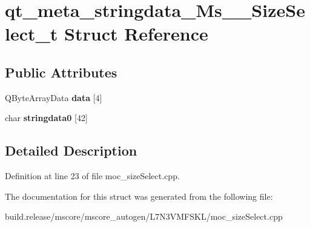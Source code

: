 \hypertarget{structqt__meta__stringdata___ms_____size_select__t}{}\section{qt\+\_\+meta\+\_\+stringdata\+\_\+\+Ms\+\_\+\+\_\+\+Size\+Select\+\_\+t Struct Reference}
\label{structqt__meta__stringdata___ms_____size_select__t}
\subsection*{Public Attributes}
\begin{DoxyCompactItemize}
\item 
\mbox{\label{structqt__meta__stringdata___ms_____size_select__t_af05d3c49e8dad7b0787eee63bbfb9cac}} 
Q\+Byte\+Array\+Data {\bfseries data} \mbox{[}4\mbox{]}
\item 
\mbox{\label{structqt__meta__stringdata___ms_____size_select__t_ae730424e8c3cfb3b09b45a3983503eaa}} 
char {\bfseries stringdata0} \mbox{[}42\mbox{]}
\end{DoxyCompactItemize}


\subsection{Detailed Description}


Definition at line 23 of file moc\+\_\+size\+Select.\+cpp.



The documentation for this struct was generated from the following file\+:\begin{DoxyCompactItemize}
\item 
build.\+release/mscore/mscore\+\_\+autogen/\+L7\+N3\+V\+M\+F\+S\+K\+L/moc\+\_\+size\+Select.\+cpp\end{DoxyCompactItemize}
